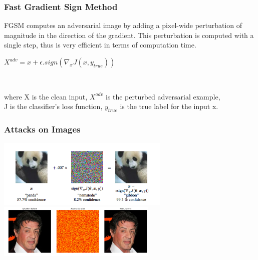 \documentclass[t,10pt,pdftex]{beamer}
\begin{document}
\begin{frame}
	\frametitle{Fast Gradient Sign Method}
	 FGSM computes an adversarial image by adding a pixel-wide perturbation of magnitude in the direction of the gradient. This perturbation is computed with a single step, thus is very efficient in terms of computation time.\\\bigskip
        
        \centerline{$X^{adv} = x + \epsilon . sign(\nabla_{x}J(x, y_{true}))$}\\
       \begin{flushleft}
        where X is the clean input, $X^{adv}$ is the perturbed adversarial example,\\J  is the classifier's loss function,   $y_{true}$  is the true label for the input x.\\
        \end{flushleft}
\end{frame}

\begin{frame}
\frametitle{Attacks on Images}
\hspace{-0.5in}
		\includegraphics[width=3.25in]{goodfellow.png}
\hspace{4.5in}\includegraphics[width=3in]{social.png}

		\end{frame}
		
\end{document}
